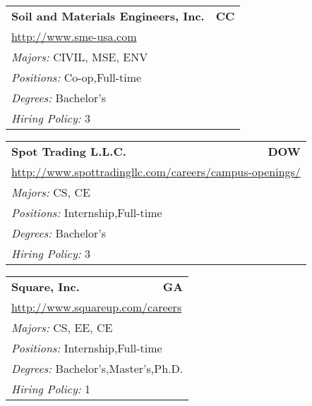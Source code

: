 \documentclass[twoside]{article}
\begin{document}
\begin{center}
\begin{multicols}{3}
\begin{FlushLeft}
\begin{minipage}{.9\columnwidth}
\end{minipage}
 
\begin{minipage}{.9\columnwidth}\begin{tabularx}{.95\columnwidth}{Xr}
                 {\Large\bf Soil and Materials Engineers, Inc.} & {\Large\bf CC}\\
    \multicolumn{2}{p{.95\columnwidth}}{\url{http://www.sme-usa.com}}\\
    \multicolumn{2}{p{.95\columnwidth}}{\emph{Majors:} CIVIL, MSE, ENV}\\
    \multicolumn{2}{p{.95\columnwidth}}{\emph{Positions:} Co-op,Full-time}\\
    \multicolumn{2}{p{.95\columnwidth}}{\emph{Degrees:} Bachelor's}\\
    \multicolumn{2}{p{.95\columnwidth}}{\emph{Hiring Policy:} 3}\\
    \end{tabularx}
    
\end{minipage}
 
\begin{minipage}{.9\columnwidth}\begin{tabularx}{.95\columnwidth}{Xr}
                 {\Large\bf Spot Trading L.L.C.} & {\Large\bf DOW}\\
    \multicolumn{2}{p{.95\columnwidth}}{\url{http://www.spottradingllc.com/careers/campus-openings/}}\\
    \multicolumn{2}{p{.95\columnwidth}}{\emph{Majors:} CS, CE}\\
    \multicolumn{2}{p{.95\columnwidth}}{\emph{Positions:} Internship,Full-time}\\
    \multicolumn{2}{p{.95\columnwidth}}{\emph{Degrees:} Bachelor's}\\
    \multicolumn{2}{p{.95\columnwidth}}{\emph{Hiring Policy:} 3}\\
    \end{tabularx}
    
\end{minipage}
 
\begin{minipage}{.9\columnwidth}\begin{tabularx}{.95\columnwidth}{Xr}
                 {\Large\bf Square, Inc.} & {\Large\bf GA}\\
    \multicolumn{2}{p{.95\columnwidth}}{\url{http://www.squareup.com/careers}}\\
    \multicolumn{2}{p{.95\columnwidth}}{\emph{Majors:} CS, EE, CE}\\
    \multicolumn{2}{p{.95\columnwidth}}{\emph{Positions:} Internship,Full-time}\\
    \multicolumn{2}{p{.95\columnwidth}}{\emph{Degrees:} Bachelor's,Master's,Ph.D.}\\
    \multicolumn{2}{p{.95\columnwidth}}{\emph{Hiring Policy:} 1}\\
    \end{tabularx}
    

\end{minipage}
\end{FlushLeft}
\end{multicols}
\end{center}
\end{document}
